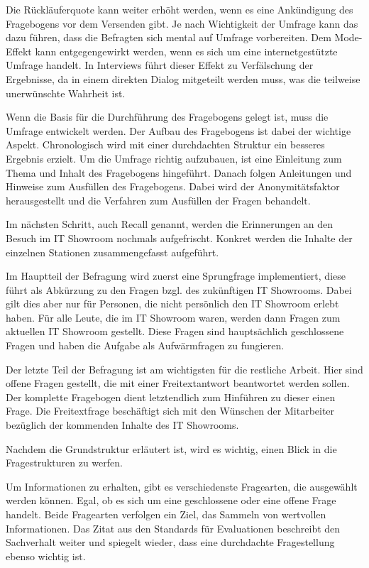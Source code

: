 Die Rückläuferquote kann weiter erhöht werden, wenn es eine Ankündigung des Fragebogens vor dem Versenden gibt. 
Je nach Wichtigkeit der Umfrage kann das dazu führen, dass die Befragten sich mental auf Umfrage vorbereiten\autocite[S.38]{Umfragenforschung}.
Dem Mode-Effekt kann entgegengewirkt werden, wenn es sich um eine internetgestützte Umfrage handelt.
In Interviews führt dieser Effekt zu Verfälschung der Ergebnisse, da in einem direkten Dialog mitgeteilt werden muss, was die teilweise unerwünschte Wahrheit ist\autocite[S.163]{Umfragenforschung}.

Wenn die Basis für die Durchführung des Fragebogens gelegt ist, muss die Umfrage entwickelt werden. 
Der Aufbau des Fragebogens ist dabei der wichtige Aspekt.
Chronologisch wird mit einer durchdachten Struktur ein besseres Ergebnis erzielt.
Um die Umfrage richtig aufzubauen, ist eine Einleitung zum Thema und Inhalt des Fragebogens hingeführt. 
Danach folgen Anleitungen und Hinweise zum Ausfüllen des Fragebogens.
Dabei wird der Anonymitätsfaktor herausgestellt und die Verfahren zum Ausfüllen der Fragen behandelt.

Im nächsten Schritt, auch Recall genannt, werden die Erinnerungen an den Besuch im IT Showroom nochmals aufgefrischt. 
Konkret werden die Inhalte der einzelnen Stationen zusammengefasst aufgeführt.

Im Hauptteil der Befragung wird zuerst eine Sprungfrage implementiert, diese führt als Abkürzung zu den Fragen bzgl. des zukünftigen IT Showrooms. Dabei gilt dies aber nur für Personen, die nicht persönlich den IT Showroom erlebt haben. 
Für alle Leute, die im IT Showroom waren, werden dann Fragen zum aktuellen IT Showroom gestellt. Diese Fragen sind hauptsächlich geschlossene Fragen und haben die Aufgabe als Aufwärmfragen zu fungieren.

Der letzte Teil der Befragung ist am wichtigsten für die restliche Arbeit. 
Hier sind offene Fragen gestellt, die mit einer Freitextantwort beantwortet werden sollen.
Der komplette Fragebogen dient letztendlich zum Hinführen zu dieser einen Frage.
Die Freitextfrage beschäftigt sich mit den Wünschen der Mitarbeiter bezüglich der kommenden Inhalte des IT Showrooms.


Nachdem die Grundstruktur erläutert ist, wird es wichtig, einen Blick in die Fragestrukturen zu werfen.
 
Um Informationen zu erhalten, gibt es verschiedenste Fragearten, die ausgewählt werden können.
Egal, ob es sich um eine geschlossene oder eine offene Frage handelt\autocite[S.31]{2009Fragebogen}. %
Beide Fragearten verfolgen ein Ziel, das Sammeln von wertvollen Informationen.
Das Zitat aus den Standards für Evaluationen beschreibt den Sachverhalt weiter und spiegelt wieder, dass eine durchdachte Fragestellung ebenso wichtig ist.

